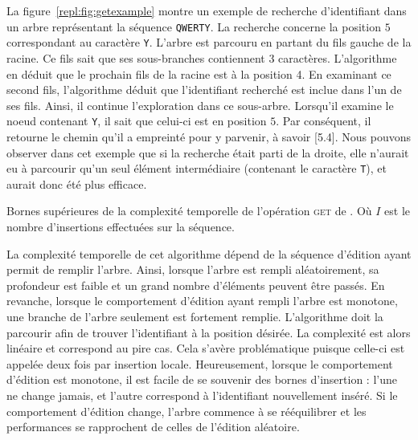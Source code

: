 La figure~\ref{repl:fig:getexample} montre un exemple de recherche d'identifiant
dans un arbre représentant la séquence \texttt{QWERTY}. La recherche concerne la
position $5$ correspondant au caractère \texttt{Y}. L'arbre est parcouru en
partant du fils gauche de la racine. Ce fils sait que ses sous-branches
contiennent 3 caractères. L'algorithme en déduit que le prochain fils de la
racine est à la position 4. En examinant ce second fils, l'algorithme déduit que
l'identifiant recherché est inclue dans l'un de ses fils. Ainsi, il continue
l'exploration dans ce sous-arbre. Lorsqu'il examine le noeud contenant
\texttt{Y}, il sait que celui-ci est en position $5$. Par conséquent, il
retourne le chemin qu'il a empreinté pour y parvenir, à savoir [5.4]. Nous
pouvons observer dans cet exemple que si la recherche était parti de la droite,
elle n'aurait eu à parcourir qu'un seul élément intermédiaire (contenant le
caractère \texttt{T}), et aurait donc été plus efficace.

\begin{table}
  \begin{center}
    \caption[Bornes supérieures de la complexité temporelle de l'opération
    \textsc{get} de \LSEQ] {\label{repl:table:lseqlookup} Bornes supérieures de
      la complexité temporelle de l'opération \textsc{get} de \LSEQ. Où $I$ est
      le nombre d'insertions effectuées sur la séquence.}
    
  \end{center}
\end{table}

La complexité temporelle de cet algorithme dépend de la séquence d'édition ayant
permit de remplir l'arbre. Ainsi, lorsque l'arbre est rempli aléatoirement, sa
profondeur est faible et un grand nombre d'éléments peuvent être passés. En
revanche, lorsque le comportement d'édition ayant rempli l'arbre est monotone,
une branche de l'arbre seulement est fortement remplie. L'algorithme doit la
parcourir afin de trouver l'identifiant à la position désirée. La complexité est
alors linéaire et correspond au pire cas. Cela s'avère problématique puisque
celle-ci est appelée deux fois par insertion locale. Heureusement, lorsque le
comportement d'édition est monotone, il est facile de se souvenir des bornes
d'insertion : l'une ne change jamais, et l'autre correspond à l'identifiant
nouvellement inséré. Si le comportement d'édition change, l'arbre commence à se
rééquilibrer et les performances se rapprochent de celles de l'édition
aléatoire.

